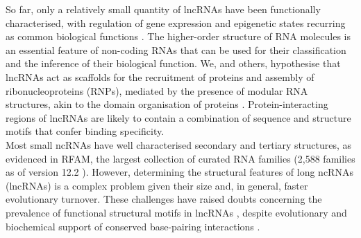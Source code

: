 \documentclass[a4paper,11pt]{article}
\begin{document}
So far, only a relatively small quantity of lncRNAs have been functionally characterised, 
with regulation of gene expression and epigenetic states recurring as common 
biological functions \cite{morris2014rise,engreitz2016long}. 
The higher-order structure of RNA molecules is an essential feature of non-coding 
RNAs that can be used for their classification and the inference of their biological function. 
We, and others, hypothesise that lncRNAs act as scaffolds for the recruitment of 
proteins and assembly of ribonucleoproteins (RNPs), mediated by the presence 
of modular RNA structures, akin to the domain organisation of proteins 
\cite{zappulla2006rna,hogg2008structured,rinn2012genome,mercer2013structure,smith2013widespread,chujo2016architectural,blythe2016ins}. 
Protein-interacting regions of lncRNAs are likely to contain a combination 
of sequence and structure motifs that confer binding specificity.\\

Most small ncRNAs have well characterised secondary and tertiary structures, 
as evidenced in RFAM, the largest collection of curated RNA families (2,588 families as of version 12.2 \cite{rfam12}). 
However, determining the structural features of  long ncRNAs (lncRNAs) is a complex problem given their size and, 
in general,  faster evolutionary turnover.  
 These challenges have raised doubts concerning the prevalence of functional structural  motifs in lncRNAs \cite{eddy2014computational,rivas2016statistical}, 
 despite evolutionary and biochemical support of conserved base-pairing interactions \cite{smith2013widespread,spitale2015structural,lu2016rna}.\\

  
\end{document}
